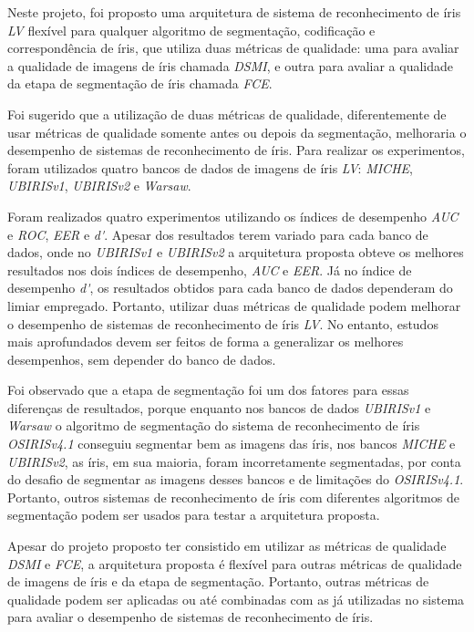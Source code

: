 
\par Neste projeto, foi proposto uma arquitetura de sistema de reconhecimento de íris \textit{\acrshort{LV}} flexível para qualquer algoritmo de segmentação, codificação e correspondência de íris, que utiliza duas métricas de qualidade: uma para avaliar a qualidade de imagens de íris chamada \textit{\acrshort{DSMI}}, e outra para avaliar a qualidade da etapa de segmentação de íris chamada \textit{\acrshort{FCE}}. 

\par Foi sugerido que a utilização de duas métricas de qualidade, diferentemente de usar métricas de qualidade somente antes ou depois da segmentação, melhoraria o desempenho de sistemas de reconhecimento de íris. Para realizar os experimentos, foram utilizados quatro bancos de dados de imagens de íris \textit{\acrshort{LV}}: \textit{MICHE}, \textit{UBIRISv1}, \textit{UBIRISv2} e \textit{\acrfull{Warsaw}}. 

\par Foram realizados quatro experimentos utilizando os índices de desempenho \textit{\acrshort{AUC}} e \textit{\acrshort{ROC}}, \textit{\acrshort{EER}} e \textit{\acrshort{d'}}. Apesar dos resultados terem variado para cada banco de dados, onde no \textit{UBIRISv1} e \textit{UBIRISv2} a arquitetura proposta obteve os melhores resultados nos dois índices de desempenho, \textit{\acrshort{AUC}} e \textit{\acrshort{EER}}. Já no índice de desempenho \textit{\acrshort{d'}}, os resultados obtidos para cada banco de dados dependeram do limiar empregado. Portanto, utilizar duas métricas de qualidade podem melhorar o desempenho de sistemas de reconhecimento de íris \textit{\acrshort{LV}}. No entanto, estudos mais aprofundados devem ser feitos de forma a generalizar os melhores desempenhos, sem depender do banco de dados.

\par Foi observado que a etapa de segmentação foi um dos fatores para essas diferenças de resultados, porque enquanto nos bancos de dados \textit{UBIRISv1} e \textit{\acrshort{Warsaw}} o algoritmo de segmentação do sistema de reconhecimento de íris \textit{OSIRISv4.1} conseguiu segmentar bem as imagens das íris, nos bancos \textit{MICHE} e \textit{UBIRISv2}, as íris, em sua maioria, foram incorretamente segmentadas, por conta do desafio de segmentar as imagens desses bancos e de limitações do \textit{OSIRISv4.1}. Portanto, outros sistemas de reconhecimento de íris com diferentes algoritmos de segmentação podem ser usados para testar a arquitetura proposta.

\par Apesar do projeto proposto ter consistido em utilizar as métricas de qualidade \textit{\acrshort{DSMI}} e \textit{\acrshort{FCE}}, a arquitetura proposta é flexível para outras métricas de qualidade de imagens de íris e da etapa de segmentação. Portanto, outras métricas de qualidade podem ser aplicadas ou até combinadas com as já utilizadas no sistema para avaliar o desempenho de sistemas de reconhecimento de íris.